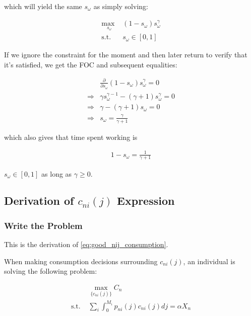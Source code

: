 \documentclass[10pt]{article}
\begin{document}
which will yield the same $s_\omega$ as simply solving:

\begin{align}
    \underset{s_\omega}{\text{max }} &\left(1-s_\omega\right) s_\omega^\gamma \\
    \text{s.t. } &s_\omega \in [0,1]
\end{align}

If we ignore the constraint for the moment 
and then later return to verify that it's satisfied, 
we get the FOC and subsequent equalities:

\begin{align}
    &\frac{\partial}{\partial s_\omega} \left(1-s_\omega\right) s_\omega^\gamma = 0 \\
    \Rightarrow &\gamma s_\omega^{\gamma-1}-(\gamma+1)s_\omega^\gamma = 0 \\
    \Rightarrow &\gamma - (\gamma+1)s_\omega = 0 \\
    \Rightarrow &s_\omega = \frac{\gamma}{\gamma+1}
\end{align}

which also gives that time spent working is

\begin{align}
    1 - s_\omega = \frac{1}{\gamma+1}
\end{align}

$s_\omega \in [0,1]$ as long as $\gamma \geq 0$.



\subsection{Derivation of $c_{n i}(j)$ Expression} 
\label{sec:good_nij_consumption}

\subsubsection{Write the Problem}
This is the derivation of \eqref{eq:good_nij_consumption}.

When making consumption decisions surrounding
$c_{n i}(j)$, an individual is solving the following problem:

\begin{align}
    &\underset{\{c_{n i}(j)\}}{\max} C_n \\ 
    \text{s.t. } &\sum_i \int_{0}^{M_i} p_{n i}(j) c_{n i}(j) d j=\alpha X_n
\end{align}
\end{document}
